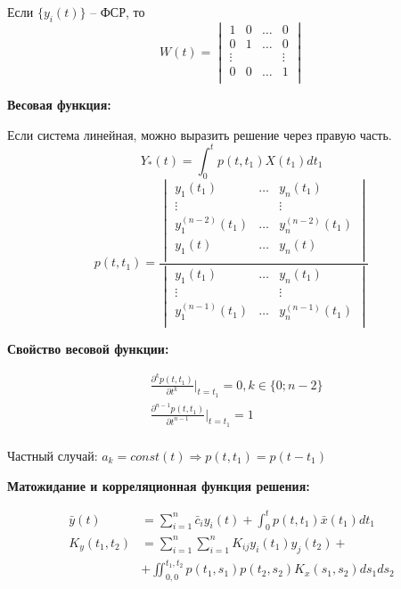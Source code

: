 \documentclass[a4paper,11pt, twocolumn]{article}
\begin{document}
Если $ \{ y_i(t) \} $ -- ФСР, то
\[ W(t) = \begin{vmatrix}
    1 & 0 & \dots & 0 \\
    0 & 1 & \dots & 0 \\
    \vdots & & & \vdots \\
    0 & 0 & \dots & 1 \\
\end{vmatrix} \]

\textbf{ Весовая функция: }

Если система линейная, можно выразить решение через правую часть.
\[ Y_*(t) = \int_{0}^{t} p(t,t_1) X(t_1) d t_1 \]
\[ p(t, t_1) = \frac{\begin{vmatrix}
         y_1(t_1) & \dots & y_n(t_1) \\
        \vdots & & \vdots \\
        y_1^{(n-2)}(t_1) & \dots & y_n^{(n-2)}(t_1) \\
        y_1(t) & \dots & y_n(t) \\
\end{vmatrix}}{\begin{vmatrix}
        y_1(t_1) & \dots & y_n(t_1) \\
        \vdots & & \vdots \\
        y_1^{(n-1)}(t_1) & \dots & y_n^{(n-1)}(t_1) \\
\end{vmatrix}} \]

\textbf{ Свойство весовой функции: }

\begin{align*}
    & \frac{\partial^k p(t, t_1)}{\partial t^{k}}|_{t=t_1} = 0, k \in \{ 0; n-2 \} \\
    & \frac{\partial^{n-1} p(t, t_1)}{\partial t^{n-1}}|_{t=t_1} = 1 \\
\end{align*}

Частный случай: $ a_k = const(t) \Rightarrow p(t, t_1) = p(t-t_1) $

\textbf{ Матожидание и корреляционная функция решения: }

\begin{align*}
     \bar y(t) & = \sum_{i=1}^{n} \bar c_i y_i(t) + \int_{0}^{t} p(t, t_1) \bar x(t_1) d t_1 \\
    K_y(t_1, t_2) & = \sum_{i=1}^{n} \sum_{i=1}^{n} K_{ij} y_i(t_1) y_j(t_2) + \\
    & + \iint_{0,0}^{t_1, t_2} p(t_1, s_1) p(t_2, s_2) K_x(s_1, s_2) d s_1 d s_2
\end{align*}
\end{document}
